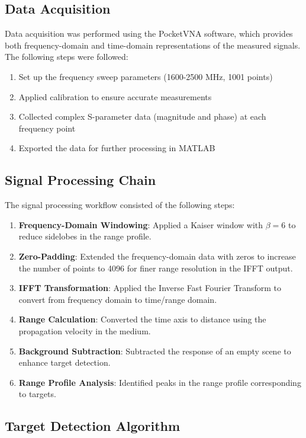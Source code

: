\documentclass[11pt,a4paper]{article}
\begin{document}
\subsection{Data Acquisition}

Data acquisition was performed using the PocketVNA software, which provides both frequency-domain and time-domain representations of the measured signals. The following steps were followed:

\begin{enumerate}
    \item Set up the frequency sweep parameters (1600-2500 MHz, 1001 points)
    \item Applied calibration to ensure accurate measurements
    \item Collected complex S-parameter data (magnitude and phase) at each frequency point
    \item Exported the data for further processing in MATLAB
\end{enumerate}

\subsection{Signal Processing Chain}

The signal processing workflow consisted of the following steps:

\begin{enumerate}
    \item \textbf{Frequency-Domain Windowing}: Applied a Kaiser window with $\beta = 6$ to reduce sidelobes in the range profile.
    \item \textbf{Zero-Padding}: Extended the frequency-domain data with zeros to increase the number of points to 4096 for finer range resolution in the IFFT output.
    \item \textbf{IFFT Transformation}: Applied the Inverse Fast Fourier Transform to convert from frequency domain to time/range domain.
    \item \textbf{Range Calculation}: Converted the time axis to distance using the propagation velocity in the medium.
    \item \textbf{Background Subtraction}: Subtracted the response of an empty scene to enhance target detection.
    \item \textbf{Range Profile Analysis}: Identified peaks in the range profile corresponding to targets.
\end{enumerate}

\subsection{Target Detection Algorithm}
\end{document}

